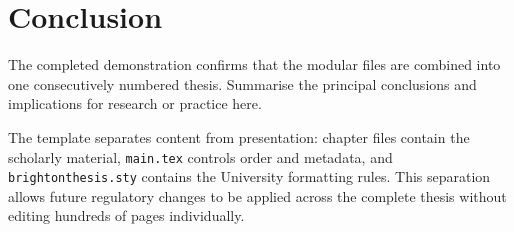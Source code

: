 \chapter{Conclusion}

The completed demonstration confirms that the modular files are combined into
one consecutively numbered thesis. Summarise the principal conclusions and
implications for research or practice here.

The template separates content from presentation: chapter files contain the
scholarly material, \texttt{main.tex} controls order and metadata, and
\texttt{brightonthesis.sty} contains the University formatting rules. This
separation allows future regulatory changes to be applied across the complete
thesis without editing hundreds of pages individually.
